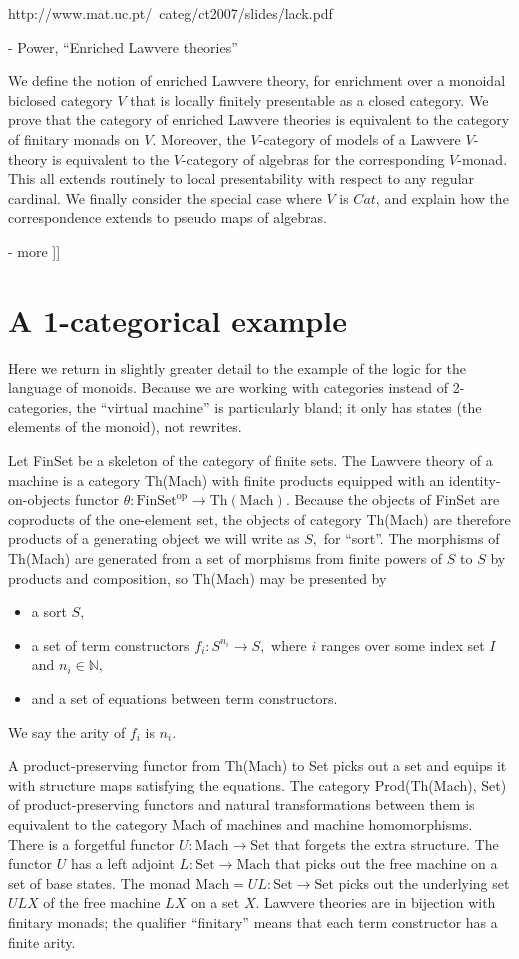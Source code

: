 \documentclass{article}
\newcommand{\maps}{\colon}
\newcommand{\FinSet}{\mathrm{FinSet}}
\newcommand{\Set}{\mathrm{Set}}
\newcommand{\Mach}{\mathrm{Mach}}
\newcommand{\op}{\mathrm{op}}
\newcommand{\NN}{\mathbb{N}}
\begin{document}
  http://www.mat.uc.pt/~categ/ct2007/slides/lack.pdf

- Power, ``Enriched Lawvere theories''

  We define the notion of enriched Lawvere theory, for enrichment over a monoidal biclosed category $V$ that is locally finitely presentable as a closed category. We prove that the category of enriched Lawvere theories is equivalent to the category of finitary monads on $V$. Moreover, the $V$-category of models of a Lawvere $V$-theory is equivalent to the $V$-category of algebras for the corresponding $V$-monad. This all extends routinely to local presentability with respect to any regular cardinal. We finally consider the special case where $V$ is $Cat$, and explain how the correspondence extends to pseudo maps of algebras.

- more
]]

\section{A 1-categorical example}

Here we return in slightly greater detail to the example of the logic for the language of monoids.  Because we are working with categories instead of 2-categories, the ``virtual machine'' is particularly bland; it only has states (the elements of the monoid), not rewrites.

Let FinSet be a skeleton of the category of finite sets.  The Lawvere theory of a machine is a category Th(Mach) with finite products equipped with an identity-on-objects functor $\theta\maps \FinSet^\op \to \mathrm{Th(Mach)}.$  Because the objects of FinSet are coproducts of the one-element set, the objects of category Th(Mach) are therefore products of a generating object we will write as $S,$ for ``sort''.  The morphisms of Th(Mach) are generated from a set of morphisms from finite powers of $S$ to $S$ by products and composition, so Th(Mach) may be presented by 
\begin{itemize}
  \item a sort $S$,
  \item a set of term constructors $f_i\maps S^{n_i} \to S,$ where $i$ ranges over some index set $I$ and $n_i \in \NN,$
  \item and a set of equations between term constructors.
\end{itemize}
We say the arity of $f_i$ is $n_i.$

A product-preserving functor from Th(Mach) to Set picks out a set and equips it with structure maps satisfying the equations.  The category Prod(Th(Mach), Set) of product-preserving functors and natural transformations between them is equivalent to the category Mach of machines and machine homomorphisms.  There is a forgetful functor ${U\maps \Mach \to \Set}$ that forgets the extra structure.  The functor $U$ has a left adjoint ${L\maps \Set \to \Mach}$ that picks out the free machine on a set of base states.  The monad $\Mach = UL\maps \Set \to \Set$ picks out the underlying set $ULX$ of the free machine $LX$ on a set $X$.  Lawvere theories are in bijection with finitary monads; the qualifier ``finitary'' means that each term constructor has a finite arity.
\end{document}
